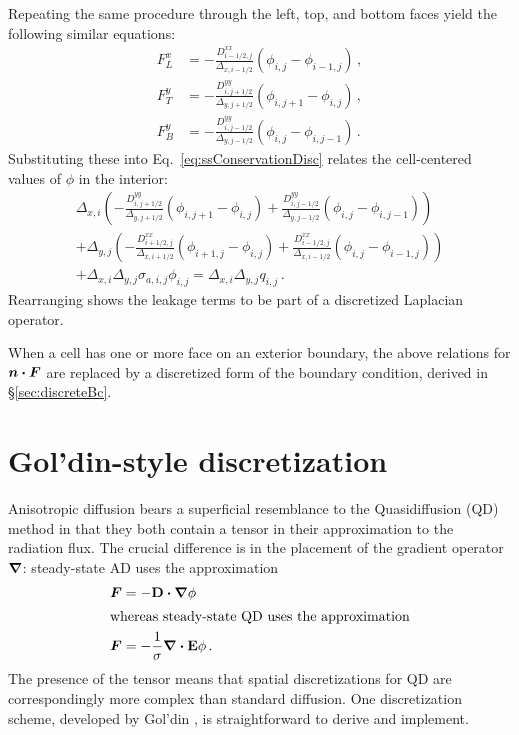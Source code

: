 Repeating the same procedure through the left, top, and bottom faces yield the
following similar equations:
\begin{align*}
  F_L^x &= -\frac{D^{xx}_{i-1/2,j}}{\Delta_{x,i-1/2}}
  \left( \phi_{i,j} - \phi_{i-1,j} \right)\,,
  \\
  F_T^y &= -\frac{D^{yy}_{i,j+1/2}}{\Delta_{y,j+1/2}}
  \left( \phi_{i,j+1} - \phi_{i,j} \right)\,,
  \\
  F_B^y &= -\frac{D^{yy}_{i,j-1/2}}{\Delta_{y,j-1/2}}
  \left( \phi_{i,j} - \phi_{i,j-1} \right)\,.
\end{align*}
Substituting these into Eq.~\eqref{eq:ssConservationDisc} relates the
cell-centered values of $\phi$ in the interior:
\begin{multline} \label{eq:diagConservation}
  \Delta_{x,i} \left(
  - \frac{D^{yy}_{i,j+1/2}}{\Delta_{y,j+1/2}} \left( \phi_{i,j+1} - \phi_{i,j}
    \right)
  + \frac{D^{yy}_{i,j-1/2}}{\Delta_{y,j-1/2}} \left( \phi_{i,j} - \phi_{i,j-1}
    \right)
  \right)
\\
+ \Delta_{y,j} \left(
  - \frac{D^{xx}_{i+1/2,j}}{\Delta_{x,i+1/2}} \left( \phi_{i+1,j} - \phi_{i,j}
    \right)
  + \frac{D^{xx}_{i-1/2,j}}{\Delta_{x,i-1/2}} \left( \phi_{i,j} - \phi_{i-1,j}
    \right)
  \right)
\\
+ \Delta_{x,i}\Delta_{y,j} \sigma_{a,i,j} \phi_{i,j}
= \Delta_{x,i}\Delta_{y,j} q_{i,j}\,.
\end{multline}
Rearranging shows the leakage terms to be part of a discretized Laplacian
operator.

When a cell has one or more face on an exterior boundary, the above relations
for $\bm{n}\bm{\cdot} \bm{F}$ are replaced by a discretized form of the boundary
condition, derived in \S\ref{sec:discreteBc}.

\section{Gol'din-style discretization}

Anisotropic diffusion bears a superficial resemblance to the
Quasidiffusion (QD) method in that they both contain a tensor in their
approximation to the radiation flux. The crucial difference is in the placement
of the gradient operator $\bm{\nabla}$: steady-state AD uses the approximation
\begin{align*}
  \bm{F} &= - \mathbf{D} \bm{\cdot} \bm{\nabla} \phi
  \\ 
  \intertext{whereas steady-state QD uses the approximation}
  \bm{F} &= - \frac{1}{\sigma} \bm{\nabla} \bm{\cdot} \mathbf{E} \phi\,.
\end{align*}
The presence of the tensor means that spatial discretizations for QD are
correspondingly more complex than standard diffusion. One discretization scheme,
developed by Gol'din \cite{Val2002}, is straightforward to derive and implement.

